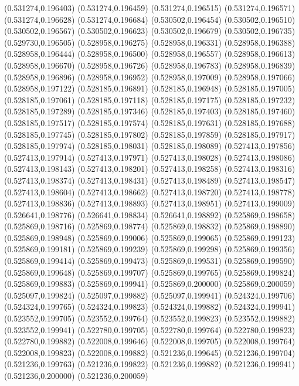 (0.531274,0.196403)
(0.531274,0.196459)
(0.531274,0.196515)
(0.531274,0.196571)
(0.531274,0.196628)
(0.531274,0.196684)
(0.530502,0.196454)
(0.530502,0.196510)
(0.530502,0.196567)
(0.530502,0.196623)
(0.530502,0.196679)
(0.530502,0.196735)
(0.529730,0.196505)
(0.528958,0.196275)
(0.528958,0.196331)
(0.528958,0.196388)
(0.528958,0.196444)
(0.528958,0.196500)
(0.528958,0.196557)
(0.528958,0.196613)
(0.528958,0.196670)
(0.528958,0.196726)
(0.528958,0.196783)
(0.528958,0.196839)
(0.528958,0.196896)
(0.528958,0.196952)
(0.528958,0.197009)
(0.528958,0.197066)
(0.528958,0.197122)
(0.528185,0.196891)
(0.528185,0.196948)
(0.528185,0.197005)
(0.528185,0.197061)
(0.528185,0.197118)
(0.528185,0.197175)
(0.528185,0.197232)
(0.528185,0.197289)
(0.528185,0.197346)
(0.528185,0.197403)
(0.528185,0.197460)
(0.528185,0.197517)
(0.528185,0.197574)
(0.528185,0.197631)
(0.528185,0.197688)
(0.528185,0.197745)
(0.528185,0.197802)
(0.528185,0.197859)
(0.528185,0.197917)
(0.528185,0.197974)
(0.528185,0.198031)
(0.528185,0.198089)
(0.527413,0.197856)
(0.527413,0.197914)
(0.527413,0.197971)
(0.527413,0.198028)
(0.527413,0.198086)
(0.527413,0.198143)
(0.527413,0.198201)
(0.527413,0.198258)
(0.527413,0.198316)
(0.527413,0.198374)
(0.527413,0.198431)
(0.527413,0.198489)
(0.527413,0.198547)
(0.527413,0.198604)
(0.527413,0.198662)
(0.527413,0.198720)
(0.527413,0.198778)
(0.527413,0.198836)
(0.527413,0.198893)
(0.527413,0.198951)
(0.527413,0.199009)
(0.526641,0.198776)
(0.526641,0.198834)
(0.526641,0.198892)
(0.525869,0.198658)
(0.525869,0.198716)
(0.525869,0.198774)
(0.525869,0.198832)
(0.525869,0.198890)
(0.525869,0.198948)
(0.525869,0.199006)
(0.525869,0.199065)
(0.525869,0.199123)
(0.525869,0.199181)
(0.525869,0.199239)
(0.525869,0.199298)
(0.525869,0.199356)
(0.525869,0.199414)
(0.525869,0.199473)
(0.525869,0.199531)
(0.525869,0.199590)
(0.525869,0.199648)
(0.525869,0.199707)
(0.525869,0.199765)
(0.525869,0.199824)
(0.525869,0.199883)
(0.525869,0.199941)
(0.525869,0.200000)
(0.525869,0.200059)
(0.525097,0.199824)
(0.525097,0.199882)
(0.525097,0.199941)
(0.524324,0.199706)
(0.524324,0.199765)
(0.524324,0.199823)
(0.524324,0.199882)
(0.524324,0.199941)
(0.523552,0.199705)
(0.523552,0.199764)
(0.523552,0.199823)
(0.523552,0.199882)
(0.523552,0.199941)
(0.522780,0.199705)
(0.522780,0.199764)
(0.522780,0.199823)
(0.522780,0.199882)
(0.522008,0.199646)
(0.522008,0.199705)
(0.522008,0.199764)
(0.522008,0.199823)
(0.522008,0.199882)
(0.521236,0.199645)
(0.521236,0.199704)
(0.521236,0.199763)
(0.521236,0.199822)
(0.521236,0.199882)
(0.521236,0.199941)
(0.521236,0.200000)
(0.521236,0.200059)
